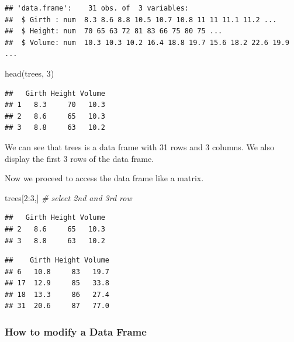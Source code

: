 \documentclass[
]{book}
\newenvironment{Shaded}{\begin{snugshade}}{\end{snugshade}}
\newcommand{\CommentTok}[1]{\textcolor[rgb]{0.56,0.35,0.01}{\textit{#1}}}
\newcommand{\DecValTok}[1]{\textcolor[rgb]{0.00,0.00,0.81}{#1}}
\newcommand{\FunctionTok}[1]{\textcolor[rgb]{0.00,0.00,0.00}{#1}}
\newcommand{\NormalTok}[1]{#1}
\newcommand{\SpecialCharTok}[1]{\textcolor[rgb]{0.00,0.00,0.00}{#1}}
\begin{document}
\begin{verbatim}
## 'data.frame':    31 obs. of  3 variables:
##  $ Girth : num  8.3 8.6 8.8 10.5 10.7 10.8 11 11 11.1 11.2 ...
##  $ Height: num  70 65 63 72 81 83 66 75 80 75 ...
##  $ Volume: num  10.3 10.3 10.2 16.4 18.8 19.7 15.6 18.2 22.6 19.9 ...
\end{verbatim}

\begin{Shaded}
\begin{Highlighting}[]
\FunctionTok{head}\NormalTok{(trees, }\DecValTok{3}\NormalTok{)}
\end{Highlighting}
\end{Shaded}

\begin{verbatim}
##   Girth Height Volume
## 1   8.3     70   10.3
## 2   8.6     65   10.3
## 3   8.8     63   10.2
\end{verbatim}

We can see that trees is a data frame with 31 rows and 3 columns. We also display the first 3 rows of the data frame.

Now we proceed to access the data frame like a matrix.

\begin{Shaded}
\begin{Highlighting}[]
\NormalTok{trees[}\DecValTok{2}\SpecialCharTok{:}\DecValTok{3}\NormalTok{,]    }\CommentTok{\# select 2nd and 3rd row}
\end{Highlighting}
\end{Shaded}

\begin{verbatim}
##   Girth Height Volume
## 2   8.6     65   10.3
## 3   8.8     63   10.2
\end{verbatim}

\begin{Shaded}
\end{Shaded}

\begin{verbatim}
##    Girth Height Volume
## 6   10.8     83   19.7
## 17  12.9     85   33.8
## 18  13.3     86   27.4
## 31  20.6     87   77.0
\end{verbatim}

\hypertarget{how-to-modify-a-data-frame}{%
\subsubsection{How to modify a Data Frame}\label{how-to-modify-a-data-frame}}
\end{document}
